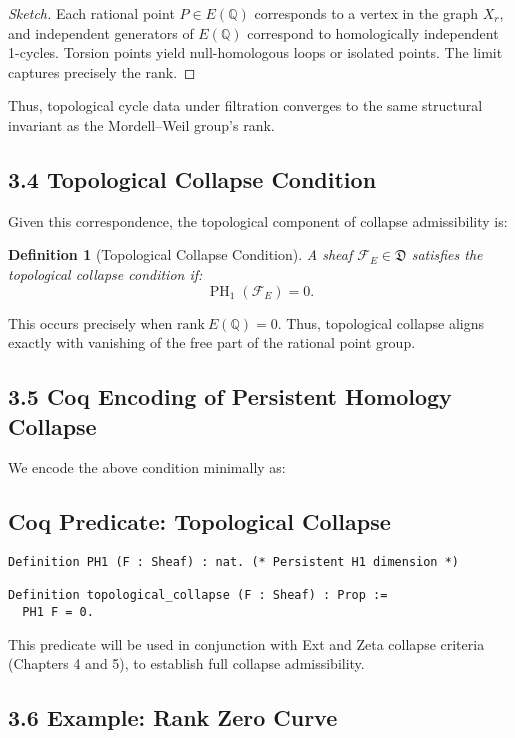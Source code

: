\documentclass[11pt]{article}
\newtheorem{definition}[theorem]{Definition}
\DeclareMathOperator{\PH}{PH}
\begin{document}
\begin{proof}[Sketch]
Each rational point \( P \in E(\mathbb{Q}) \) corresponds to a vertex in the graph \( X_r \), and independent generators of \( E(\mathbb{Q}) \) correspond to homologically independent 1-cycles. Torsion points yield null-homologous loops or isolated points. The limit captures precisely the rank.
\end{proof}

Thus, topological cycle data under filtration converges to the same structural invariant as the Mordell–Weil group’s rank.

\subsection*{3.4 Topological Collapse Condition}

Given this correspondence, the topological component of collapse admissibility is:

\begin{definition}[Topological Collapse Condition]
A sheaf \( \mathcal{F}_E \in \mathfrak{D} \) satisfies the topological collapse condition if:
\[
\PH_1(\mathcal{F}_E) = 0.
\]
\end{definition}

This occurs precisely when \( \mathrm{rank}~E(\mathbb{Q}) = 0 \). Thus, topological collapse aligns exactly with vanishing of the free part of the rational point group.

\subsection*{3.5 Coq Encoding of Persistent Homology Collapse}

We encode the above condition minimally as:

\subsection*{Coq Predicate: Topological Collapse}
\begin{lstlisting}[language=Coq]
Definition PH1 (F : Sheaf) : nat. (* Persistent H1 dimension *)

Definition topological_collapse (F : Sheaf) : Prop :=
  PH1 F = 0.
\end{lstlisting}


This predicate will be used in conjunction with Ext and Zeta collapse criteria (Chapters 4 and 5), to establish full collapse admissibility.

\subsection*{3.6 Example: Rank Zero Curve}
\end{document}
